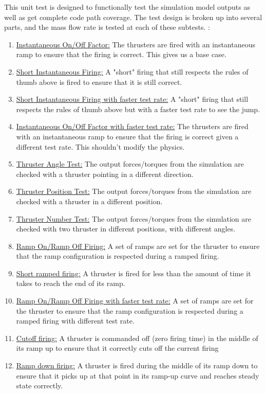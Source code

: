 \noindent This unit test is designed to functionally test the simulation model 
outputs as well as get complete code path coverage. 
The test design is broken 
up into several parts, and the mass flow rate is tested at each of these subtests. :\\
\begin{enumerate}
\item{\underline{Instantaneous On/Off Factor:} The thrusters are fired with an 
  instantaneous ramp to ensure that the firing is correct. This gives us a base case.}
\item{\underline{Short Instantaneous Firing:} A "short" firing that still respects the 
  rules of thumb above is fired to ensure that it is still correct.}
 \item{\underline{Short Instantaneous Firing with faster test rate:} A "short" firing that still respects the 
  rules of thumb above but with a faster test rate to see the jump.}
 \item{\underline{Instantaneous On/Off Factor with faster test rate:} The thrusters are fired with an 
  instantaneous ramp to ensure that the firing is correct given a different test rate. This shouldn't modify the physics.}
 \item{\underline{Thruster Angle Test:} The output forces/torques from the simulation 
  are checked with a thruster pointing in a different direction.}
   \item{\underline{Thruster Position Test:} The output forces/torques from the simulation 
  are checked with a thruster in a different position.}
   \item{\underline{Thruster Number Test:} The output forces/torques from the simulation 
  are checked with two thruster in different positions, with different angles.}
\item{\underline{Ramp On/Ramp Off Firing:} A set of ramps are set for the thruster to ensure 
  that the ramp configuration is respected during a ramped firing.}
  \item{\underline{Short ramped firing:} A thruster is fired for less than the amount of time it 
   takes to reach the end of its ramp.}
\item{\underline{Ramp On/Ramp Off Firing with faster test rate:} A set of ramps are set for the thruster to ensure 
  that the ramp configuration is respected during a ramped firing with different test rate.}
\item{\underline{Cutoff firing:} A thruster is commanded off (zero firing time) in the middle 
   of its ramp up to ensure that it correctly cuts off the current firing}
\item{\underline{Ramp down firing:} A thruster is fired during the middle of its ramp down 
   to ensure that it picks up at that point in its ramp-up curve and reaches 
   steady state correctly.}
\end{enumerate}


